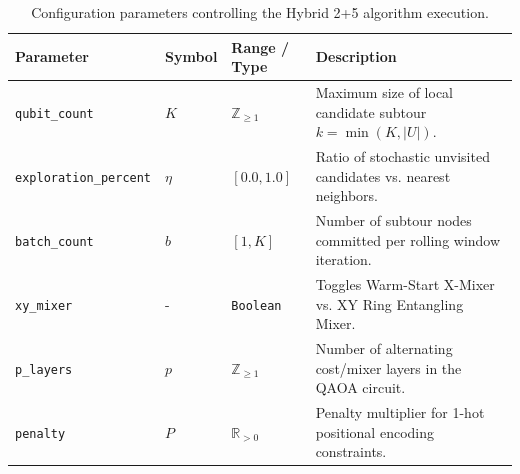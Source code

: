 \documentclass[11pt,a4paper]{article}
\begin{document}
\begin{table}[h!]
\centering
\begin{tabular}{@{}llll@{}}
\toprule
\textbf{Parameter} & \textbf{Symbol} & \textbf{Range / Type} & \textbf{Description} \\ \midrule
\texttt{qubit\_count} & $K$ & $\mathbb{Z}_{\ge 1}$ & Maximum size of local candidate subtour $k = \min(K, |U|)$. \\
\texttt{exploration\_percent} & $\eta$ & $[0.0, 1.0]$ & Ratio of stochastic unvisited candidates vs. nearest neighbors. \\
\texttt{batch\_count} & $b$ & $[1, K]$ & Number of subtour nodes committed per rolling window iteration. \\
\texttt{xy\_mixer} & - & \texttt{Boolean} & Toggles Warm-Start X-Mixer vs. XY Ring Entangling Mixer. \\
\texttt{p\_layers} & $p$ & $\mathbb{Z}_{\ge 1}$ & Number of alternating cost/mixer layers in the QAOA circuit. \\
\texttt{penalty} & $P$ & $\mathbb{R}_{> 0}$ & Penalty multiplier for 1-hot positional encoding constraints. \\ \bottomrule
\end{tabular}
\caption{Configuration parameters controlling the Hybrid 2+5 algorithm execution.}
\end{table}
\end{document}
